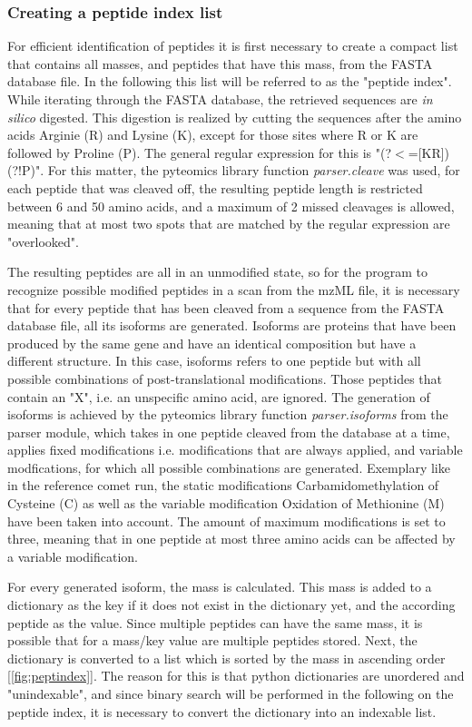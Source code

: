 \documentclass[11pt]{article}
\begin{document}
\subsubsection{Creating a peptide index list}
For efficient identification of peptides it is first necessary to create a compact list that contains all masses, and peptides that have this mass, from the FASTA database file. In the following this list will be referred to as the "peptide index". While iterating through the FASTA database, the retrieved sequences are \textit{in silico} digested. This digestion is realized by cutting the sequences after the amino acids Arginie (R) and Lysine (K), except for those sites where R or K are followed by Proline (P). The general regular expression for this is "(?$<$=[KR])(?!P)". For this matter, the pyteomics library function \textit{parser.cleave} was used, for each peptide that was cleaved off, the resulting peptide length is restricted between 6 and 50 amino acids, and a maximum of 2 missed cleavages is allowed, meaning that at most two spots that are matched by the regular expression are "overlooked". 

The resulting peptides are all in an unmodified state, so for the program to recognize possible modified peptides in a scan from the mzML file, it is necessary that for every peptide that has been cleaved from a sequence from the FASTA database file, all its isoforms are generated. Isoforms are proteins that have been produced by the same gene and have an identical composition but have a different structure. In this case, isoforms refers to one peptide but with all possible combinations of post-translational modifications. Those peptides that contain an "X", i.e. an unspecific amino acid, are ignored. The generation of isoforms is achieved by the pyteomics library function \textit{parser.isoforms} from the parser module, which takes in one peptide cleaved from the database at a time, applies fixed modifications i.e. modifications that are always applied, and variable modfications, for which all possible combinations are generated. Exemplary like in the reference comet run, the static modifications Carbamidomethylation of Cysteine (C) as well as the variable modification Oxidation of Methionine (M) have been taken into account. The amount of maximum modifications is set to three, meaning that in one peptide at most three amino acids can be affected by a variable modification.

For every generated isoform, the mass is calculated. This mass is added to a dictionary as the key if it does not exist in the dictionary yet, and the according peptide as the value. Since multiple peptides can have the same mass, it is possible that for a mass/key value are multiple peptides stored. Next, the dictionary is converted to a list which is sorted by the mass in ascending order [\cref{fig:peptindex}]. The reason for this is that python dictionaries are unordered and "unindexable", and since binary search will be performed in the following on the peptide index, it is necessary to convert the dictionary into an indexable list.
 
\end{document}

